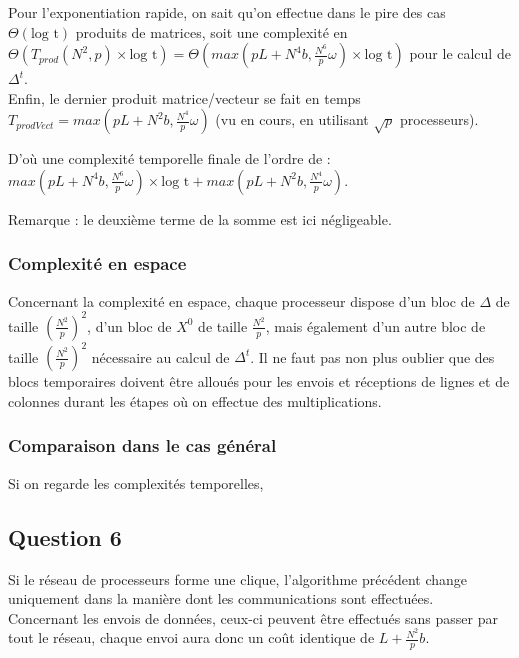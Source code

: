 \documentclass{article}
\begin{document}
Pour l'exponentiation rapide, on sait qu'on effectue dans le pire des cas $\Theta(\text{log t})$ produits de matrices, soit une complexité en $\Theta(T_{prod}(N^2,p)\times \text{log t}) = \Theta \left( max \left( pL + N^4 b, \frac{N^6}{p} \omega \right) \times \text{log t} \right) $ pour le calcul de $\Delta^t$. \\

Enfin, le dernier produit matrice/vecteur se fait en temps $T_{prodVect} = max \left( pL + N^2 b, \frac{N^4}{p} \omega \right) $ (vu en cours, en utilisant $\sqrt{p}$ processeurs).

D'où une complexité temporelle finale de l'ordre de : $max \left( pL + N^4 b, \frac{N^6}{p} \omega \right) \times \text{log t} + max \left( pL + N^2 b, \frac{N^4}{p} \omega \right)$.

Remarque : le deuxième terme de la somme est ici négligeable.

\subsubsection*{Complexité en espace}

Concernant la complexité en espace, chaque processeur dispose d'un bloc de $\Delta$ de taille $\left(\frac{N^2}{p}\right)^2$, d'un bloc de $X^0$ de taille $\frac{N^2}{p}$, mais également d'un autre bloc de taille $\left(\frac{N^2}{p}\right)^2$ nécessaire au calcul de $\Delta^t$. Il ne faut pas non plus oublier que des blocs temporaires doivent être alloués pour les envois et réceptions de lignes et de colonnes durant les étapes où on effectue des multiplications. %

\subsubsection*{Comparaison dans le cas général} 

Si on regarde les complexités temporelles, 

\subsection*{Question 6}

Si le réseau de processeurs forme une clique, l'algorithme précédent change uniquement dans la manière dont les communications sont effectuées. \\

Concernant les envois de données, ceux-ci peuvent être effectués sans passer par tout le réseau, chaque envoi aura donc un coût identique de $L + \frac{N^2}{p} b$. \\
\end{document}

